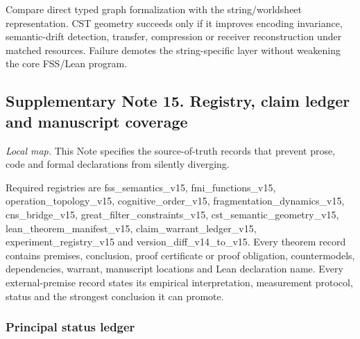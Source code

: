 Compare direct typed graph formalization with the string/worldsheet
representation. CST geometry succeeds only if it improves encoding
invariance, semantic-drift detection, transfer, compression or receiver
reconstruction under matched resources. Failure demotes the
string-specific layer without weakening the core FSS/Lean program.

\hypertarget{supplementary-note-15.-registry-claim-ledger-and-manuscript-coverage}{%
\subsection{Supplementary Note 15. Registry, claim ledger and manuscript
coverage}\label{supplementary-note-15.-registry-claim-ledger-and-manuscript-coverage}}

\emph{Local map.} This Note specifies the source-of-truth records that
prevent prose, code and formal declarations from silently diverging.

Required registries are fss\_semantics\_v15, fmi\_functions\_v15,
operation\_topology\_v15, cognitive\_order\_v15,
fragmentation\_dynamics\_v15, cns\_bridge\_v15,
great\_filter\_constraints\_v15, cst\_semantic\_geometry\_v15,
lean\_theorem\_manifest\_v15, claim\_warrant\_ledger\_v15,
experiment\_registry\_v15 and version\_diff\_v14\_to\_v15. Every theorem
record contains premises, conclusion, proof certificate or proof
obligation, countermodels, dependencies, warrant, manuscript locations
and Lean declaration name. Every external-premise record states its
empirical interpretation, measurement protocol, status and the strongest
conclusion it can promote.

\hypertarget{principal-status-ledger}{%
\subsubsection{Principal status ledger}\label{principal-status-ledger}}

